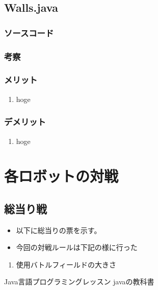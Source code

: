\documentclass[12pt]{jarticle} %
\begin{document}
\begin{flushleft}
\subsection{Walls.java}
\subsubsection{ソースコード}

\subsubsection{考察}
\subsubsection{メリット}
\begin{enumerate}
\item hoge
\end{enumerate}
\subsubsection{デメリット}
\begin{enumerate}
\item hoge
\end{enumerate}

\section{各ロボットの対戦}

\subsection{総当り戦}
\begin{itemize}
\item 以下に総当りの票を示す。
\item 今回の対戦ルールは下記の様に行った
\end{itemize}

\hrulefill

\begin{enumerate}
\item 使用バトルフィールドの大きさ
\end{enumerate}

\end{flushleft}


\begin{thebibliography}{9} 
	\bibitem{}Java言語プログラミングレッスン
	\bibitem{}javaの教科書
\end{thebibliography}
\end{document}
